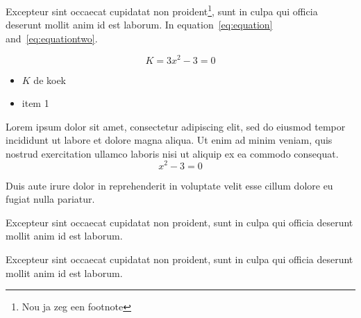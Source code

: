\documentclass[a4paper,12pt]{extarticle}
\begin{document}

Excepteur sint occaecat cupidatat non proident\footnote{Nou ja zeg een footnote}, sunt in culpa qui officia deserunt mollit anim id est laborum. In equation~\ref{eq:equation} and~\ref{eq:equationtwo}.

\begin{equation} \label{eq:equation}
    K=3x^2 - 3 = 0 
\end{equation}

\begin{itemize}
    \item $K$ de koek
    \item item 1
\end{itemize}
Lorem ipsum dolor sit amet, consectetur adipiscing elit, sed do eiusmod tempor incididunt ut labore et dolore magna aliqua. Ut enim ad minim veniam, quis nostrud exercitation ullamco laboris nisi ut aliquip ex ea commodo consequat.\\

\begin{equation} \label{eq:equationtwo}
    x^2 - 3 = 0
\end{equation}


Duis aute irure dolor in reprehenderit in voluptate velit esse cillum dolore eu fugiat nulla pariatur.


  \label{q:vraagzes}

\newpage
Excepteur sint occaecat cupidatat non proident, sunt in culpa qui officia deserunt mollit anim id est laborum.


\vspace{-\lineheight}%
\begin{multicols}{2}%
\columnbreak%
\end{multicols}
Excepteur sint occaecat cupidatat non proident, sunt in culpa qui officia deserunt mollit anim id est laborum.
\end{document}
